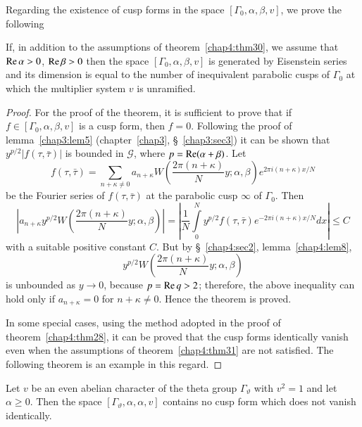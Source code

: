 Regarding the existence of cusp forms in the space $[\Gamma_0,
  \alpha,\beta, v]$, we prove the following 

\begin{thm}\label{chap4:thm31}
If, in addition to the assumptions of theorem~\ref{chap4:thm30}, we assume that
$\operatorname{Re}\alpha>0$, $\operatorname{Re} \beta>0$ then the space $[\Gamma_0, \alpha,
  \beta,v]$ is generated by Eisenstein series and its dimension is
equal to the number of inequivalent parabolic cusps of $\Gamma_0$ at
which the multiplier system $v$ is unramified.
\end{thm}

\begin{proof}
For \pageoriginale the proof of the theorem, it is sufficient to prove
that if $f\in [\Gamma_0, \alpha, \beta, v]$ is a cusp form,
then $f=0$. Following the proof of lemma~\ref{chap3:lem5} 
(chapter~\ref{chap3}, \S~\ref{chap3:sec3}) it can
be shown that $y^{p/2}|f(\tau,\bar{\tau})|$ is bounded in
$\mathscr{G}$, where $p=\operatorname{Re}(\alpha+\beta)$. Let 
$$
f(\tau,\bar{\tau}) = \sum_{n+\kappa\neq 0} a_{n+\kappa} W
(\frac{2\pi(n+\kappa)}{N} y ; \alpha, \beta) e^{2\pi i(n+\kappa)x/N}
$$
be the Fourier series of $f(\tau,\bar{\tau})$ at the parabolic cusp
$\infty$ of $\Gamma_0$. Then
$$
|a_{n+\kappa} y^{p/2} W(\frac{2\pi(n+\kappa)}{N}y;\alpha,\beta)| =
|\frac{1}{N} \int\limits^N_0 y^{p/2} f(\tau,\bar{\tau}) e^{-2\pi
  i(n+\kappa)x/N} dx | \leq C
$$
with a suitable positive constant $C$. But by \S~\ref{chap4:sec2}, 
lemma~\ref{chap4:lem8},
$$y^{p/2}W(\dfrac{2\pi(n+\kappa)}{N}y;\alpha, \beta)$$ 
is unbounded as
$y\to 0$, because $p=\operatorname{Re} q>2$; therefore, the above inequality can
hold only if $a_{n+\kappa}=0$ for $n+\kappa \neq 0$. Hence the theorem
is proved.

In some special cases, using the method adopted in the proof of
theorem~\ref{chap4:thm28}, it can be proved that the cusp forms 
identically vanish even when the assumptions of theorem~\ref{chap4:thm31} are 
not satisfied. The  following theorem is an example in this regard.
\end{proof}

\begin{thm}\label{chap4:thm32}
Let $v$ be an even abelian character of the theta group
$\Gamma_{\vartheta}$ with $v^2=1$ and let $\alpha \geq 0$. Then the
space $[\Gamma_{\vartheta},\alpha, \alpha, v]$ contains no cusp form
which does not vanish identically.
\end{thm}

